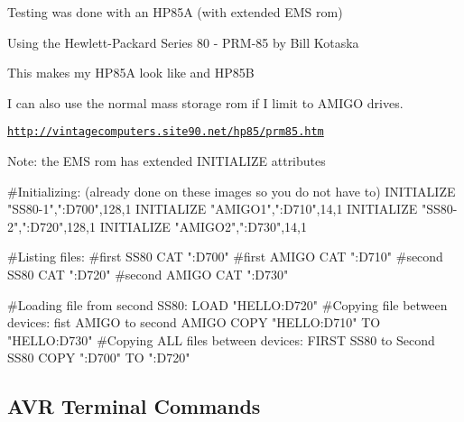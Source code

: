 \begin{DoxyItemize}
\item Testing was done with an H\+P85A (with extended E\+MS rom)
\begin{DoxyItemize}
\item Using the Hewlett-\/\+Packard Series 80 -\/ P\+R\+M-\/85 by Bill Kotaska
\item This makes my H\+P85A look like and H\+P85B
\begin{DoxyItemize}
\item I can also use the normal mass storage rom if I limit to A\+M\+I\+GO drives.
\item \href{http://vintagecomputers.site90.net/hp85/prm85.htm}{\tt http\+://vintagecomputers.\+site90.\+net/hp85/prm85.\+htm}
\end{DoxyItemize}
\end{DoxyItemize}
\item Note\+: the E\+MS rom has extended I\+N\+I\+T\+I\+A\+L\+I\+ZE attributes 
\begin{DoxyPre}
  #Initializing: (already done on these images so you do not have to)
  INITIALIZE "SS80-1",":D700",128,1
  INITIALIZE "AMIGO1",":D710",14,1
  INITIALIZE "SS80-2",":D720",128,1
  INITIALIZE "AMIGO2",":D730",14,1\end{DoxyPre}

\end{DoxyItemize}


\begin{DoxyPre}  #Listing files:
  #first SS80
  CAT ":D700"
  #first AMIGO
  CAT ":D710"
  #second SS80
  CAT ":D720"
  #second AMIGO
  CAT ":D730"\end{DoxyPre}



\begin{DoxyPre}  #Loading file from second SS80:
  LOAD "HELLO:D720"
  #Copying file between devices: fist AMIGO to second AMIGO
  COPY "HELLO:D710" TO "HELLO:D730"
  #Copying ALL files between devices: FIRST SS80 to Second SS80
  COPY ":D700" TO ":D720"
\end{DoxyPre}
 



\subsection*{A\+VR Terminal Commands}



